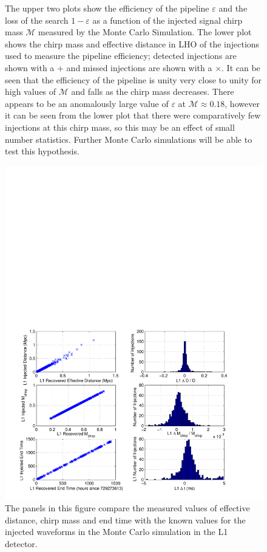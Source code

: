 \begin{figure}[p]
{\label{f:mchirp_eff}%
The upper two plots show the efficiency of the pipeline $\varepsilon$ and the
loss of the search $1-\varepsilon$ as a function of the injected signal chirp
mass $\mathcal{M}$ measured by the Monte Carlo Simulation. The lower plot
shows the chirp mass and effective distance in LHO of the injections used to
measure the pipeline efficiency; detected injections are shown with a $+$ and
missed injections are shown with a $\times$. It can be seen that the
efficiency of the pipeline is unity very close to unity for high values of
$\mathcal{M}$ and falls as the chirp mass decreases. There appears to be an
anomalously large value of $\varepsilon$ at $\mathcal{M}\approx 0.18$, however
it can be seen from the lower plot that there were comparatively few
injections at this chirp mass, so this may be an effect of small number
statistics. Further Monte Carlo simulations will be able to test this
hypothesis.
}
\end{figure}

\begin{figure}[p]
\begin{center}
\includegraphics[width=\textwidth]{figures/result/l1_param_error}
\end{center}
\caption[Measurement accuracy of L1 Injection Parameters]{%
\label{f:l1_param_error}%
The panels in this figure compare the measured values of effective distance,
chirp mass and end time with the known values for the injected waveforms in
the Monte Carlo simulation in the L1 detector.
}
\end{figure}

